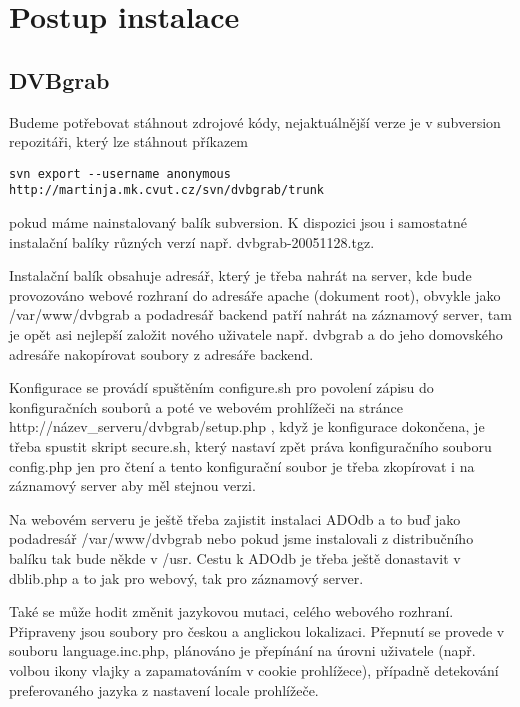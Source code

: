 
\chapter{Postup instalace}

\section{DVBgrab}

Budeme potřebovat stáhnout zdrojové kódy, nejaktuálnější verze je v subversion repozitáři, který lze stáhnout příkazem
\begin{small}\begin{verbatim}svn export --username anonymous http://martinja.mk.cvut.cz/svn/dvbgrab/trunk\end{verbatim}\end{small}
pokud máme nainstalovaný balík subversion.
K dispozici jsou i samostatné instalační balíky různých verzí např. dvbgrab-20051128.tgz.

\vspace{10pt}

Instalační balík obsahuje adresář, který je třeba nahrát na server, kde bude provozováno webové rozhraní do adresáře apache (dokument root), obvykle jako /var/www/dvbgrab a podadresář backend patří nahrát na záznamový server, tam je opět asi nejlepší založit nového uživatele např. dvbgrab a do jeho domovského adresáře nakopírovat soubory z adresáře backend.

\vspace{10pt}

Konfigurace se provádí spuštěním configure.sh pro povolení zápisu do konfiguračních souborů a poté ve webovém prohlížeči na stránce http://název\_serveru/dvbgrab/setup.php , když je konfigurace dokončena, je třeba spustit skript secure.sh, který nastaví zpět práva konfiguračního souboru config.php jen pro čtení a tento konfigurační soubor je třeba zkopírovat i na záznamový server aby měl stejnou verzi.

\vspace{10pt}

Na webovém serveru je ještě třeba zajistit instalaci ADOdb a to buď jako podadresář /var/www/dvbgrab nebo pokud jsme instalovali z distribučního balíku tak bude někde v /usr. Cestu k ADOdb je třeba ještě donastavit v dblib.php a to jak pro webový, tak pro záznamový server.

\vspace{10pt}

Také se může hodit změnit jazykovou mutaci, celého webového rozhraní. Připraveny jsou soubory pro českou a anglickou lokalizaci. Přepnutí se provede v souboru language.inc.php, plánováno je přepínání na úrovni uživatele (např. volbou ikony vlajky a zapamatováním v cookie prohlížece), případně detekování preferovaného jazyka z nastavení locale prohlížeče.

